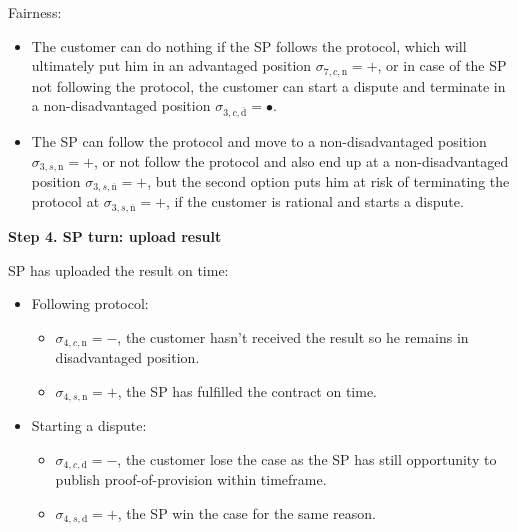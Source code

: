 \documentclass{ieeeaccess}
\begin{document}
Fairness:

\begin{itemize}

\item
  The customer can do nothing if the SP follows the protocol, which will
  ultimately put him in an advantaged position
  \(\sigma_{7, c, \mathrm{n}} = +\), or in case of the SP not following
  the protocol, the customer can start a dispute and terminate in a
  non-disadvantaged position
  \(\sigma_{3, c, \overline{\mathrm{d}}} = •\).
\item
  The SP can follow the protocol and move to a non-disadvantaged
  position \(\sigma_{3, s, \mathrm{n}} = +\), or not follow the protocol
  and also end up at a non-disadvantaged position
  \(\sigma_{3, s, \overline{\mathrm{n}}} = +\), but the second option
  puts him at risk of terminating the protocol at
  \(\sigma_{3, s, \overline{\mathrm{n}}} = +\), if the customer is
  rational and starts a dispute.
\end{itemize}

\noindent \textbf
{Step 4. SP turn: upload result}\label{step-4-publication-of-results}

SP has uploaded the result on time:

\begin{itemize}
\item
  Following protocol:

  \begin{itemize}
  
  \item
    \(\sigma_{4, c, \mathrm{n}} = -\), the customer hasn't received the result so he remains in disadvantaged position.
  \item
    \(\sigma_{4, s, \mathrm{n}} = +\), the SP has fulfilled the contract on time.
  \end{itemize}
\item
  Starting a dispute:

  \begin{itemize}
  
  \item
    \(\sigma_{4, c, \mathrm{d}} = -\), the customer lose the case as the
    SP has still opportunity to publish proof-of-provision within
    timeframe.
  \item
    \(\sigma_{4, s, \mathrm{d}} = +\), the SP win the case for the same
    reason.
  \end{itemize}
\end{itemize}
\end{document}
